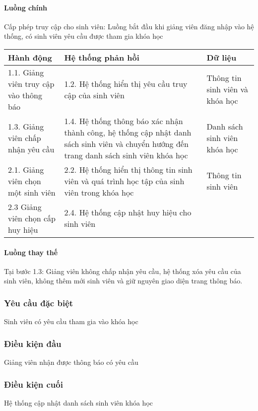 \documentclass[./../main_file.tex]{subfiles}
\begin{document}
\paragraph{Luồng chính}
Cấp phép truy cập cho sinh viên: Luồng bắt đầu khi giảng viên đăng nhập vào hệ thống, có sinh viên yêu cầu được tham gia khóa học
\begin{longtable}{|p{}|p{}|p{}|}
		\hline
		\textbf{Hành động}                     & \textbf{Hệ thống phản hồi}                                                                  & \textbf{Dữ liệu}                \\ \hline
		1.1. Giảng viên truy cập vào thông báo & 1.2. Hệ thống hiển thị yêu cầu truy cập của sinh viên                                       & Thông tin sinh viên và khóa học \\ \hline
		1.3. Giảng viên chấp nhận yêu cầu &
		1.4. Hệ thống thông báo xác nhận thành công, hệ thống cập nhật danh sách sinh viên và chuyển hướng đến trang danh sách sinh viên khóa học &
		Danh sách sinh viên khóa học \\ \hline
		2.1. Giảng viên chọn một sinh viên     & 2.2. Hệ thống hiển thị thông tin sinh viên và quá trình học tập của sinh viên trong khóa học & Thông tin sinh viên             \\ \hline
		2.3 Giảng viên chọn cấp huy hiệu       & 2.4. Hệ thống cập nhật huy hiệu cho sinh viên                                               &                                 \\ \hline
\end{longtable}
\paragraph{Luồng thay thế}
Tại bước 1.3: Giảng viên không chấp nhận yêu cầu, hệ thống xóa yêu cầu của sinh viên, không thêm mới sinh viên và giữ nguyên giao diện trang thông báo.
\subsubsection{Yêu cầu đặc biệt}
Sinh viên có yêu cầu tham gia vào khóa học

\subsubsection{Điều kiện đầu}
Giảng viên nhận được thông báo có yêu cầu 

\subsubsection{Điều kiện cuối}
Hệ thống cập nhật danh sách sinh viên khóa học
\end{document}
